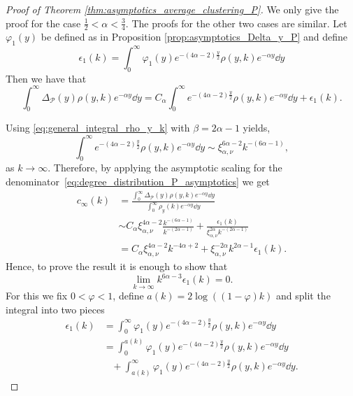 \begin{proof}[Proof of Theorem \ref{thm:asymptotics_average_clustering_P}]

We only give the proof for the case $\frac{1}{2} < \alpha < \frac{3}{4}$. The proofs for the other two cases are similar. Let $\varphi_1(y)$ be defined as in Proposition \ref{prop:asymptotics_Delta_y_P} and define
\[
	\epsilon_1(k) = \int_0^{\infty} \varphi_1(y) e^{-(4\alpha - 2)\frac{y}{2}} \rho(y,k) e^{-\alpha y} \dd y
\]
Then we have that
\[
	\int_0^{\infty} \Delta_{\mathcal{P}}(y) \rho(y,k) e^{-\alpha y} \dd y
	= C_\alpha \int_0^{\infty} e^{-(4\alpha - 2)\frac{y}{2}} \rho(y,k) e^{-\alpha y} \dd y + \epsilon_1(k).
\]

Using \eqref{eq:general_integral_rho_y_k} with $\beta = 2\alpha - 1$ yields,
\begin{equation}\label{eq:asymptotics_clustering_integral}
	\int_0^{\infty} e^{-(4\alpha - 2)\frac{y}{2}} \rho(y,k) e^{-\alpha y} \dd y 
	\sim \xi_{\alpha,\nu}^{6\alpha - 2} k^{-(6\alpha - 1)},
\end{equation}
as $k \to \infty$. Therefore, by applying the asymptotic scaling for the denominator~\eqref{eq:degree_distribution_P_asymptotics} we get
\begin{align*}
	c_\infty(k) &= \frac{\int_0^{\infty} \Delta_{\mathcal{P}}(y) \rho(y,k) e^{-\alpha y} \dd y}
		{\int_0^\infty \rho_{y}(k) e^{-\alpha y} \dd y} \\
	&\sim C_\alpha \xi_{\alpha,\nu}^{4\alpha - 2} \frac{k^{-(6\alpha - 1)}}{k^{-(2\alpha - 1)}}
	+ \frac{\epsilon_1(k)}{\xi_{\alpha,\nu}^{2\alpha} k^{-(2\alpha - 1)}}\\
	&= C_\alpha \xi_{\alpha,\nu}^{4\alpha - 2} k^{-4\alpha + 2} 
    + \xi_{\alpha,\nu}^{-2\alpha} k^{2\alpha - 1}\epsilon_1(k).
\end{align*}
Hence, to prove the result it is enough to show that
\[
	\lim_{k \to \infty} k^{6\alpha - 3}\epsilon_1(k) = 0.
\]
For this we fix $0 < \varphi < 1$, define $a(k) = 2\log((1-\varphi)k)$ and split the integral into two pieces
\begin{align*}
	\epsilon_1(k) &= \int_0^{\infty} \varphi_1(y) e^{-(4\alpha - 2)\frac{y}{2}} \rho(y,k) e^{-\alpha y} \dd y\\
	&= \int_0^{a(k)} \varphi_1(y) e^{-(4\alpha - 2)\frac{y}{2}} \rho(y,k) e^{-\alpha y} \dd y\\
	&\hspace{10pt}+ \int_{a(k)}^{\infty} \varphi_1(y) e^{-(4\alpha - 2)\frac{y}{2}} 
    	\rho(y,k) e^{-\alpha y} \dd y.
\end{align*} 

\end{proof}
